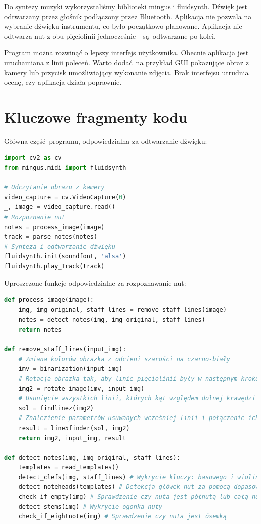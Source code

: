 \documentclass[12pt]{article}
\begin{document}
Do syntezy muzyki wykorzystaliśmy biblioteki mingus i fluidsynth. Dźwięk jest odtwarzany przez głośnik podłączony przez Bluetooth. Aplikacja nie pozwala na wybranie dźwięku instrumentu, co było początkowo planowane. Aplikacja nie odtwarza nut z obu pięciolinii jednocześnie - są odtwarzane po kolei.

Program można rozwinąć o lepszy interfejs użytkownika. Obecnie aplikacja jest uruchamiana z linii poleceń. Warto dodać na przykład GUI pokazujące obraz z kamery lub przycisk umożliwiający wykonanie zdjęcia. Brak interfejsu utrudnia ocenę, czy aplikacja działa poprawnie.

\section{Kluczowe fragmenty kodu}
Główna część programu, odpowiedzialna za odtwarzanie dźwięku:
\begin{lstlisting}[language=Python]
import cv2 as cv
from mingus.midi import fluidsynth

# Odczytanie obrazu z kamery
video_capture = cv.VideoCapture(0)
_, image = video_capture.read()
# Rozpoznanie nut
notes = process_image(image)
track = parse_notes(notes)
# Synteza i odtwarzanie dźwięku
fluidsynth.init(soundfont, 'alsa')
fluidsynth.play_Track(track)
\end{lstlisting}

Uproszczone funkcje odpowiedzialne za rozpoznawanie nut:
\begin{lstlisting}[language=Python]
def process_image(image):
	img, img_original, staff_lines = remove_staff_lines(image)
	notes = detect_notes(img, img_original, staff_lines)
	return notes
	
def remove_staff_lines(input_img):
	# Zmiana kolorów obrazka z odcieni szarości na czarno-biały
	imv = binarization(input_img) 
	# Rotacja obrazka tak, aby linie pięciolinii były w następnym kroku zawsze pod tym samym kątem
	img2 = rotate_image(imv, input_img)
	# Usunięcie wszystkich linii, których kąt względem dolnej krawędzi obrazka to 0
	sol = findlinez(img2) 
	# Znalezienie parametrów usuwanych wcześniej linii i połączenie ich w pięciolinie
	result = line5finder(sol, img2) 
	return img2, input_img, result
	
def detect_notes(img, img_original, staff_lines):
	templates = read_templates()
	detect_clefs(img, staff_lines) # Wykrycie kluczy: basowego i wiolinowego
	detect_noteheads(templates) # Detekcja główek nut za pomocą dopasowania wzorców
	check_if_empty(img) # Sprawdzenie czy nuta jest półnutą lub całą nutą
	detect_stems(img) # Wykrycie ogonka nuty
	check_if_eightnote(img) # Sprawdzenie czy nuta jest ósemką
\end{lstlisting}
\end{document}
